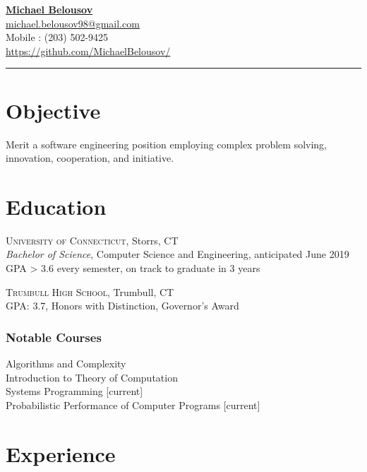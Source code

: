\documentclass[Letterpaper,11pt]{article}
\begin{document}
\setlength{\parindent}{0em}
\setlength{\parskip}{1em}
\setlength{\parsep}{1em}
\setlength{\itemsep}{0.2em}
\setlength{\headsep}{0.2em}
\setlength{\topskip}{0.2em}
\setlength{\topmargin}{0.2em}
\setlength{\topsep}{0.2em}
\setlength{\partopsep}{0.2em}
\setlength{\columnsep}{1em}

\addtolength{\topmargin}{-2em}

\textbf{\href{mailto:michael.belousov98@gmail.com}{\Large Michael Belousov}}\\ 
\href{mailto:michael.belousov98@gmail.com}{michael.belousov98@gmail.com}\\  
Mobile : (203) 502-9425\\
\href{https://github.com/MichaelBelousov/}{https://github.com/MichaelBelousov/}\\  
\hrule

\section*{Objective}

Merit a software engineering position employing complex problem solving, innovation, cooperation, and initiative.

\section*{Education}
    
    \textsc{University of Connecticut}, Storrs, CT\\
    \textit{Bachelor of Science}, Computer Science and Engineering, anticipated June 2019\\
    GPA > 3.6 every semester, on track to graduate in 3 years

    \textsc{Trumbull High School}, Trumbull, CT\\
    GPA: 3.7, Honors with Distinction, Governor's Award

    \subsubsection*{Notable Courses}
    Algorithms and Complexity\\
    Introduction to Theory of Computation\\
    Systems Programming [current]\\
    Probabilistic Performance of Computer Programs [current]

\section*{Experience}
\end{document}
